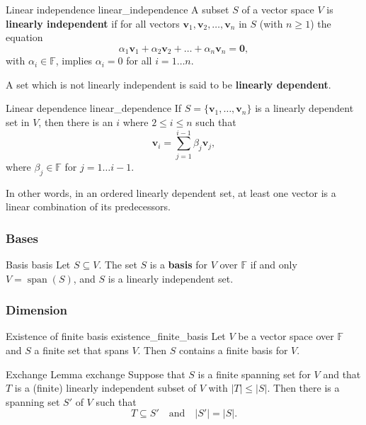 \begin{definition}{Linear independence \cite{math2601_notes}}{linear_independence}
A subset $S$ of a vector space $V$ is \textbf{linearly independent} if for all vectors $\mathbf{v}_1, \mathbf{v}_2, \ldots, \mathbf{v}_n$ in $S$ (with $n \geq 1$) the equation
$$ \alpha_1 \mathbf{v}_1 + \alpha_2 \mathbf{v}_2 + \dots + \alpha_n \mathbf{v}_n = \mathbf{0} , $$
with $\alpha_i \in \mathbb{F}$, implies $\alpha_i = 0$ for all $i = 1 \ldots n$.

A set which is not linearly independent is said to be \textbf{linearly dependent}.
\end{definition}

\begin{lemma}{Linear dependence \cite{math2601_notes}}{linear_dependence}
If $S = \{ \mathbf{v}_1, \ldots, \mathbf{v}_n \}$ is a linearly dependent set in $V$, then there is an $i$ where $2 \leq i \leq n$ such that
$$ \mathbf{v}_i = \sum_{j = 1}^{i - 1} \beta_j \mathbf{v}_j , $$
where $\beta_j \in \mathbb{F}$ for $j = 1 \ldots i - 1$.

In other words, in an ordered linearly dependent set, at least one vector is a linear combination of its predecessors.
\end{lemma}

\subsubsection{Bases}

\begin{definition}{Basis \cite{math2601_notes}}{basis}
Let $S \subseteq V$. The set $S$ is a \textbf{basis} for $V$ over $\mathbb{F}$ if and only $V = \operatorname{span}(S)$, and $S$ is a linearly independent set.
\end{definition}

\subsubsection{Dimension}

\begin{theorem}{Existence of finite basis \cite{math2601_notes}}{existence_finite_basis}
Let $V$ be a vector space over $\mathbb{F}$ and $S$ a finite set that spans $V$. Then $S$ contains a finite basis for $V$.
\end{theorem}

\begin{lemma}{Exchange Lemma \cite{math2601_notes}}{exchange}
Suppose that $S$ is a finite spanning set for $V$ and that $T$ is a (finite) linearly independent subset of $V$ with $\lvert T \rvert \leq \lvert S \rvert$. Then there is a spanning set $S'$ of $V$ such that
$$ T \subseteq S' \quad \text{and} \quad \lvert S' \rvert = \lvert S \rvert . $$
\end{lemma}

